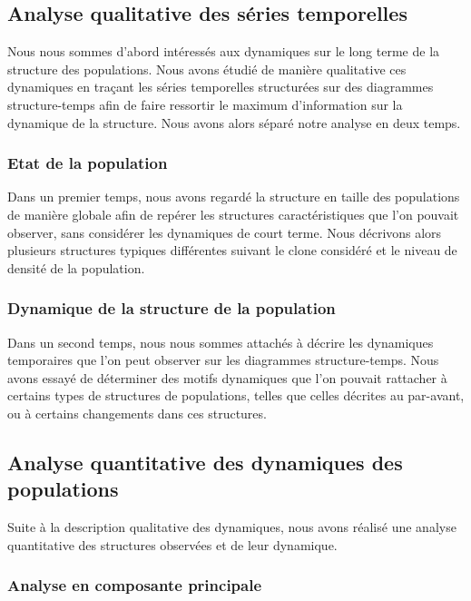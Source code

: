 \subsection{Analyse qualitative des séries temporelles}

Nous nous sommes d'abord intéressés aux dynamiques sur le long
terme de la structure des populations. Nous avons étudié de manière
qualitative ces dynamiques en traçant les séries temporelles structurées sur des
diagrammes structure-temps afin de faire ressortir le maximum d'information sur
la dynamique de la structure.
Nous avons alors séparé notre analyse en deux temps.

\subsubsection{Etat de la population}

Dans un premier temps, nous avons regardé la structure en taille des populations
de manière globale afin de repérer les structures caractéristiques que l'on
pouvait observer, sans considérer les dynamiques de court terme. Nous décrivons
alors plusieurs structures typiques différentes suivant le clone considéré et le
niveau de densité de la population.

\subsubsection{Dynamique de la structure de la population}

Dans un second temps, nous nous sommes attachés à décrire les dynamiques
temporaires que l'on peut observer sur les diagrammes structure-temps. Nous
avons essayé de déterminer des motifs dynamiques que l'on pouvait rattacher à
certains types de structures de populations, telles que celles décrites au
par-avant, ou à certains changements dans ces structures.

\subsection{Analyse quantitative des dynamiques des populations}

Suite à la description qualitative des dynamiques, nous avons réalisé une
analyse quantitative des structures observées et de leur dynamique. 

\subsubsection{Analyse en composante principale}

